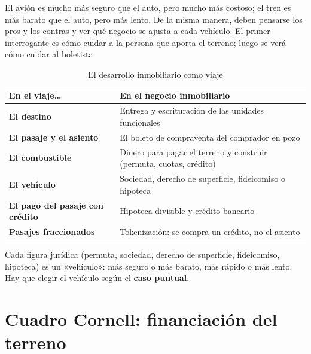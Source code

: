 \documentclass[12pt,oneside]{book}
\begin{document}
El avión es mucho más seguro que el auto, pero mucho más costoso; el tren es más barato que el auto, pero más lento. De la misma manera, deben pensarse los pros y los contras y ver qué negocio se ajusta a cada vehículo. El primer interrogante es cómo cuidar a la persona que aporta el terreno; luego se verá cómo cuidar al boletista.

\begin{table}[H]
\centering
\small
\begin{tabularx}{\textwidth}{>{\raggedright\arraybackslash}p{4.4cm}Y}
\toprule
\textbf{En el viaje\ldots} & \textbf{En el negocio inmobiliario} \\
\midrule
\textbf{El destino} & Entrega y escrituración de las unidades funcionales \\
\textbf{El pasaje y el asiento} & El boleto de compraventa del comprador en pozo \\
\textbf{El combustible} & Dinero para pagar el terreno y construir (permuta, cuotas, crédito) \\
\textbf{El vehículo} & Sociedad, derecho de superficie, fideicomiso o hipoteca \\
\textbf{El pago del pasaje con crédito} & Hipoteca divisible y crédito bancario \\
\textbf{Pasajes fraccionados} & Tokenización: se compra un crédito, no el asiento \\
\bottomrule
\end{tabularx}
\caption{El desarrollo inmobiliario como viaje}
\end{table}

\begin{important}
Cada figura jurídica (permuta, sociedad, derecho de superficie, fideicomiso, hipoteca) es un «vehículo»: más seguro o más barato, más rápido o más lento. Hay que elegir el vehículo según el \textbf{caso puntual}.
\end{important}

\section{Cuadro Cornell: financiación del terreno}
\end{document}
